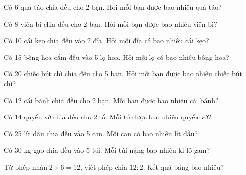 \begin{ex}
Có 6 quả táo chia đều cho 2 bạn. Hỏi mỗi bạn được bao nhiêu quả táo?
\end{ex}

\begin{ex}
Có 8 viên bi chia đều cho 2 bạn. Hỏi mỗi bạn được bao nhiêu viên bi?
\end{ex}

\begin{ex}
Có 10 cái kẹo chia đều vào 2 đĩa. Hỏi mỗi đĩa có bao nhiêu cái kẹo?
\end{ex}

\begin{ex}
Có 15 bông hoa cắm đều vào 5 lọ hoa. Hỏi mỗi lọ có bao nhiêu bông hoa?
\end{ex}

\begin{ex}
Có 20 chiếc bút chì chia đều cho 5 bạn. Hỏi mỗi bạn được bao nhiêu chiếc bút chì?
\end{ex}

\begin{ex}
Có 12 cái bánh chia đều cho 2 bạn. Mỗi bạn được bao nhiêu cái bánh?
\end{ex}

\begin{ex}
Có 14 quyển vở chia đều cho 2 tổ. Mỗi tổ được bao nhiêu quyển vở?
\end{ex}

\begin{ex}
Có 25 lít dầu chia đều vào 5 can. Mỗi can có bao nhiêu lít dầu?
\end{ex}

\begin{ex}
Có 30 kg gạo chia đều vào 5 túi. Mỗi túi nặng bao nhiêu ki-lô-gam?
\end{ex}

\begin{ex}
Từ phép nhân $2 \times 6 = 12$, viết phép chia $12 : 2$. Kết quả bằng bao nhiêu?
\end{ex}

